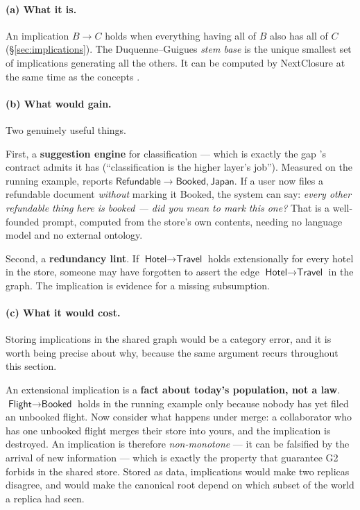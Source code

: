 \paragraph{(a) What it is.} An implication $B \to C$ holds when everything
having all of $B$ also has all of $C$ (\S\ref{sec:implications}). The
Duquenne--Guigues \emph{stem base} \citep{guigues1986} is the unique smallest
set of implications generating all the others. It can be computed by
NextClosure at the same time as the concepts \citep{ganter1984}.

\paragraph{(b) What \odag{} would gain.} Two genuinely useful things.

First, a \textbf{suggestion engine} for classification --- which is exactly
the gap \odag{}'s contract admits it has (``classification is the higher
layer's job''). Measured on the running example, \fca{} reports
$\textsf{Refundable} \to \textsf{Booked}, \textsf{Japan}$. If a user now files
a refundable document \emph{without} marking it \textsf{Booked}, the system
can say: \emph{every other refundable thing here is booked --- did you mean to
mark this one?} That is a well-founded prompt, computed from the store's own
contents, needing no language model and no external ontology.

Second, a \textbf{redundancy lint}. If $\textsf{Hotel} \to \textsf{Travel}$
holds extensionally for every hotel in the store, someone may have forgotten
to assert the edge $\textsf{Hotel} \to \textsf{Travel}$ in the graph. The
implication is evidence for a missing subsumption.

\paragraph{(c) What it would cost.} Storing implications in the shared graph
would be a category error, and it is worth being precise about why, because
the same argument recurs throughout this section.

An extensional implication is a \textbf{fact about today's population, not a
law}. $\textsf{Flight} \to \textsf{Booked}$ holds in the running example only
because nobody has yet filed an unbooked flight. Now consider what happens
under merge: a collaborator who has one unbooked flight merges their store
into yours, and the implication is destroyed. An implication is therefore
\emph{non-monotone} --- it can be falsified by the arrival of new information
--- which is exactly the property that guarantee G2 forbids in the shared
store. Stored as data, implications would make two replicas disagree, and
would make the canonical root depend on which subset of the world a replica
had seen.

